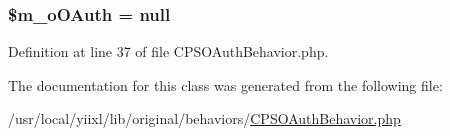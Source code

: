 \hypertarget{classCPSOAuthBehavior_a22b5346078092b10841a52e5cc930862}{
\subsubsection[{\$m\_\-oOAuth}]{\setlength{\rightskip}{0pt plus 5cm}\$m\_\-oOAuth = null}}
\label{classCPSOAuthBehavior_a22b5346078092b10841a52e5cc930862}


Definition at line 37 of file CPSOAuthBehavior.php.



The documentation for this class was generated from the following file:\begin{DoxyCompactItemize}
\item 
/usr/local/yiixl/lib/original/behaviors/\hyperlink{CPSOAuthBehavior_8php}{CPSOAuthBehavior.php}\end{DoxyCompactItemize}
